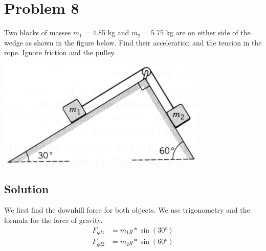 \documentclass[12pt]{article}
\begin{document}










\pagebreak
\section*{Problem 8}
Two blocks of masses $m_1$ = 4.85 kg and $m_2$ = 5.75 kg are on either side of the wedge as shown in the figure below. Find their acceleration and the tension in the rope. Ignore friction and the pulley.

\begin{center}
    \includegraphics*[width=10cm]{graph_8.png}
\end{center}

\subsection*{Solution}
We first find the downhill force for both objects. We use trigonometry and the formula for the force of gravity.
\begin{align*}
    F_{gd1} &= m_1 g * \sin(30\unit{\degree})\\
    F_{gd2} &= m_2 g * \sin(60\unit{\degree})
\end{align*}
\end{document}
